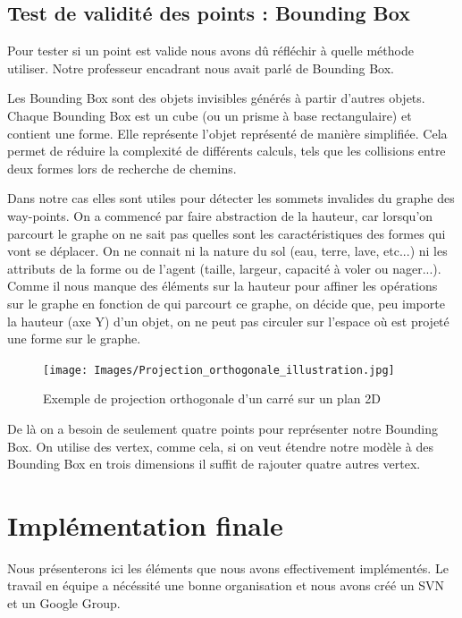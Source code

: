 \documentclass[a4paper,12pt]{report}
\begin{document}
\section{Test de validité des points : Bounding Box}

Pour tester si un point est valide nous avons dû réfléchir à quelle méthode utiliser. Notre professeur encadrant nous avait parlé de Bounding Box.

Les Bounding Box sont des objets invisibles générés à partir d'autres objets. Chaque Bounding Box est un cube (ou un prisme à base rectangulaire) et contient une forme. Elle représente l'objet représenté de manière simplifiée. Cela permet de réduire la complexité de différents calculs, tels que les collisions entre deux formes lors de recherche de chemins.

Dans notre cas elles sont utiles pour détecter les sommets invalides du graphe des way-points. On a commencé par faire abstraction de la hauteur, car lorsqu'on parcourt le graphe on ne sait pas quelles sont les caractéristiques des formes qui vont se déplacer. On ne connait ni la nature du sol (eau, terre, lave, etc...) ni les attributs de la forme ou de l'agent (taille, largeur, capacité à voler ou nager...). Comme il nous manque des éléments sur la hauteur pour affiner les opérations sur le graphe en fonction de qui parcourt ce graphe, on décide que, peu importe la hauteur (axe Y) d'un objet, on ne peut pas circuler sur l'espace où est projeté une forme sur le graphe. 

\begin{figure}[!ht]
\centering
\texttt{[image: Images/Projection\_orthogonale\_illustration.jpg]}
\caption{Exemple de projection orthogonale d'un carré sur un plan 2D}
\end{figure}
\vspace{0.5cm}


De là on a besoin de seulement quatre points pour représenter notre Bounding Box. On utilise des vertex, comme cela, si on veut étendre notre modèle à des Bounding Box en trois dimensions il suffit de rajouter quatre autres vertex.

\chapter{Implémentation finale}

Nous présenterons ici les éléments que nous avons effectivement implémentés. Le travail en équipe a nécéssité une bonne organisation et nous avons créé un SVN et un Google Group.
\end{document}
